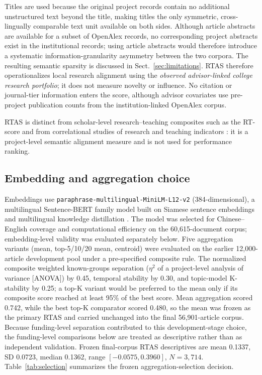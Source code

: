 \documentclass[11pt]{article}
\begin{document}
Titles are used because the original project records contain no additional unstructured text beyond the title, making titles the only symmetric, cross-lingually comparable text unit available on both sides. Although article abstracts are available for a subset of OpenAlex records, no corresponding project abstracts exist in the institutional records; using article abstracts would therefore introduce a systematic information-granularity asymmetry between the two corpora. The resulting semantic sparsity is discussed in Sect.~\ref{sec:limitations}. RTAS therefore operationalizes local research alignment using the \emph{observed advisor-linked college research portfolio}; it does not measure novelty or influence. No citation or journal-tier information enters the score, although advisor covariates use pre-project publication counts from the institution-linked OpenAlex corpus.

RTAS is distinct from scholar-level research--teaching composites such as the RT-score \citep{scafetta2025rt} and from correlational studies of research and teaching indicators \citep{maisano2023empirical}: it is a project-level semantic alignment measure and is not used for performance ranking.

\subsection{Embedding and aggregation choice}

Embeddings use \texttt{paraphrase-multilingual-MiniLM-L12-v2} (384-dimensional), a multilingual Sentence-BERT family model built on Siamese sentence embeddings and multilingual knowledge distillation \citep{reimers2019sbert,reimers2020multilingual}. The model was selected for Chinese--English coverage and computational efficiency on the 60,615-document corpus; embedding-level validity was evaluated separately below. Five aggregation variants (mean, top-5/10/20 mean, centroid) were evaluated on the earlier 12,000-article development pool under a pre-specified composite rule. The normalized composite weighted known-groups separation ($\eta^2$ of a project-level analysis of variance [ANOVA]) by 0.45, temporal stability by 0.30, and topic-model K-stability by 0.25; a top-K variant would be preferred to the mean only if its composite score reached at least 95\% of the best score. Mean aggregation scored 0.742, while the best top-K comparator scored 0.480, so the mean was frozen as the primary RTAS and carried unchanged into the final 56,901-article corpus. Because funding-level separation contributed to this development-stage choice, the funding-level comparisons below are treated as descriptive rather than as independent validation. Frozen final-corpus RTAS descriptives are mean 0.1337, SD 0.0723, median 0.1362, range $[-0.0575,0.3960]$, $N=3,714$. Table~\ref{tab:selection} summarizes the frozen aggregation-selection decision.
\end{document}

